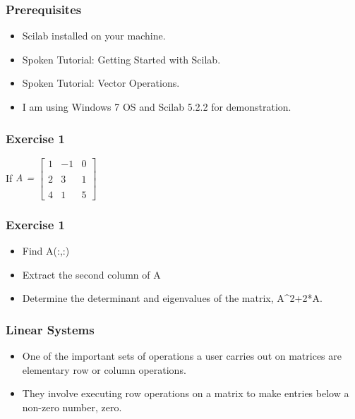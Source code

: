 \documentclass[17pt]{beamer}
\begin{document}
\begin{frame}[fragile]
\frametitle{Prerequisites}
\begin{itemize}
\item Scilab installed on your machine.\pause
\item Spoken Tutorial: Getting Started with Scilab.\pause
\item Spoken Tutorial: Vector Operations.\pause
\item I am using Windows 7 OS and Scilab 5.2.2 for demonstration.
\end{itemize}
\end{frame}








\begin{frame}[fragile]
\frametitle{Exercise 1}
If \textsl{A = $\left[
               \begin{array}{ccc}
                 1 & -1 & 0  \\ \\
                 2 & 3 & 1 \\ \\
                 4 & 1 & 5
              \end{array}
             \right]$ }\\
\end{frame}

\begin{frame}[fragile]
\frametitle{Exercise 1}
\begin{itemize}
\item Find A(:,:)
\item Extract the second column of A
\item Determine the determinant and eigenvalues of the matrix, A^2+2*A.
\end{itemize}
\end{frame}

\begin{frame}[fragile]
\frametitle{Linear Systems}
\begin{itemize}
\item One of the important sets of operations a user carries out on matrices are elementary  row or column operations.\pause
\item They involve executing row operations on a matrix to make entries below a non-zero number, zero.

\end{itemize}
\end{frame}
\end{document}

